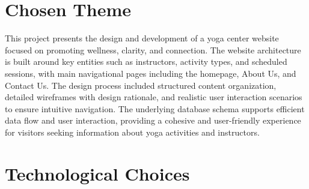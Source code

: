 
\section{Chosen Theme}
This project presents the design and development of a yoga center website focused on promoting wellness, clarity, and connection. The website architecture is built around key entities such as instructors, activity types, and scheduled sessions, with main navigational pages including the homepage, About Us, and Contact Us. The design process included structured content organization, detailed wireframes with design rationale, and realistic user interaction scenarios to ensure intuitive navigation. The underlying database schema supports efficient data flow and user interaction, providing a cohesive and user-friendly experience for visitors seeking information about yoga activities and instructors.

\section{Technological Choices}

